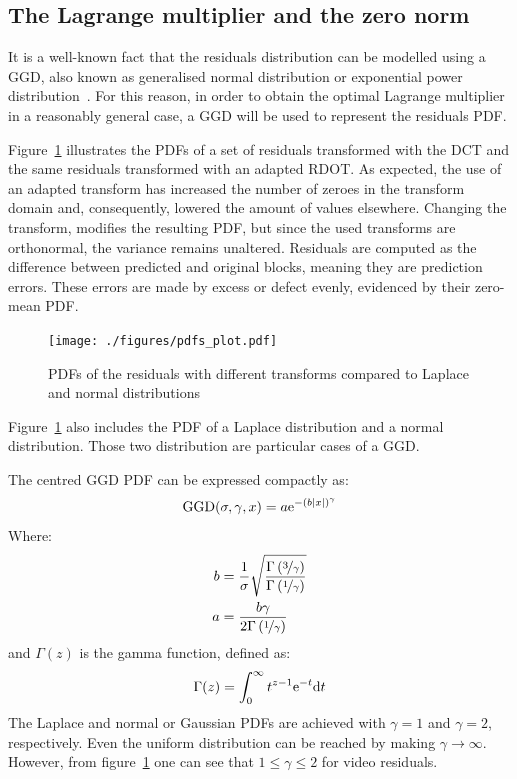 \documentclass[11pt,a4paper,openright,twoside]{book}
\numberwithin{equation}{section} %
\begin{document}
\subsection{The Lagrange multiplier and the zero norm}
\label{sub:the_lagrange_multiplier}

It is a well-known fact that the residuals distribution can be modelled
using a \ac{GGD}, also known as generalised normal distribution or
exponential power
distribution~\cite{lam-00-dct-coefficient-distribution,
yovanof-96-analysis-dct-coefficients}.
For this reason, in order to obtain the optimal Lagrange multiplier in a
reasonably general case, a \ac{GGD} will be used to represent the
residuals \ac{PDF}.

Figure~\ref{fig:probability_density_functions} illustrates the \acp{PDF}
of a set of residuals transformed with the \ac{DCT} and the same residuals
transformed with an adapted \ac{RDOT}.
As expected, the use of an adapted transform has increased the number
of zeroes in the transform domain and, consequently, lowered the amount
of values elsewhere.
Changing the transform, modifies the resulting \ac{PDF}, but
since the used transforms are orthonormal, the variance remains
unaltered.
Residuals are computed as the difference between predicted and original
blocks, meaning they are prediction errors.
These errors are made by excess or defect evenly, evidenced by their
zero-mean \ac{PDF}.
\begin{figure}[tb]
	\centering
	\texttt{[image: ./figures/pdfs\_plot.pdf]}
	\caption{\acsp{PDF} of the residuals with different transforms
	compared to Laplace and normal distributions}
	\label{fig:probability_density_functions}
\end{figure}
Figure~\ref{fig:probability_density_functions} also includes the
\ac{PDF} of a Laplace distribution and a normal distribution.
Those two distribution are particular cases of a \ac{GGD}.

The centred \ac{GGD} \ac{PDF} can be expressed compactly as:
\begin{equation}
	\text{GGD}(\sigma,\gamma,x)=
	a\text{e}^{-{\left(b\vert x \vert\right)}^\gamma}
	\label{eqn:ggd}
\end{equation}
Where:
\begin{align}
	b &= \frac{1}{\sigma}\sqrt{
	\frac{\Gamma\left(\nicefrac{3}{\gamma}\right)}
	{\Gamma \left(\nicefrac{1}{\gamma}\right)}} \\
	a &= \frac{b\gamma}{2\Gamma \left(\nicefrac{1}{\gamma}\right)}
\end{align}
and $\Gamma(z)$ is the gamma function, defined as:
\begin{equation}
	\Gamma(z) = \int_0^\infty t^{z-1}\text{e}^{-t}\text{d} t
\end{equation}
The Laplace and normal or Gaussian \acp{PDF} are achieved with
$\gamma=1$ and $\gamma=2$, respectively.
Even the uniform distribution can be reached by making $\gamma\to\infty$.
However, from figure~\ref{fig:probability_density_functions} one can see
that $1\le\gamma\le2$ for video residuals.
\end{document}
